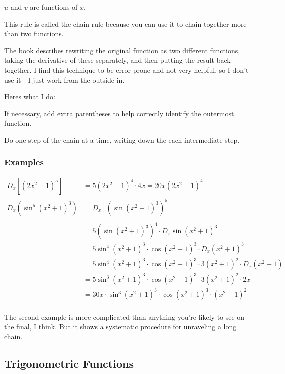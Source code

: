 \documentclass[fleqn]{article}
\begin{document}
$u$ and $v$ are functions of $x$.

This rule is called the chain rule because you can use it to chain together more than two functions.

The book describes rewriting the original function as two different functions, taking the derivative of these
separately, and then putting the result back together.  I find this technique to be error-prone and not very helpful, so
I don't use it---I just work from the outside in.  

Heres what I do:
\begin{itemize*}
\item If necessary, add extra parentheses to help correctly identify the outermost function.
\item Do one step of the chain at a time, writing down the each intermediate step.
\end{itemize*}


\subsubsection{Examples}
\begin{align*}
  D_x \left[ (2x^2 - 1)^5 \right] &= 5 (2x^2 - 1)^4 \cdot 4x = 20x (2x^2 - 1)^4 \\
  D_x \left( \sin^5 (x^2 + 1)^3 \right) &= D_x \left[ \left( \sin (x^2 + 1)^3 \right)^5 \right] \\
      &= 5 ( \sin (x^2 + 1)^3 )^4 \cdot D_x \sin (x^2 + 1)^3 \\
      &= 5 \sin^4 (x^2 + 1)^3 \cdot \cos (x^2 + 1)^3 \cdot D_x (x^2 + 1)^3 \\
      &= 5 \sin^4 (x^2 + 1)^3 \cdot \cos (x^2 + 1)^3 \cdot 3 (x^2 + 1)^2 \cdot D_x (x^2 + 1) \\
     &= 5 \sin^3 (x^2 + 1)^3 \cdot \cos (x^2 + 1)^3 \cdot 3 (x^2 + 1)^2 \cdot 2x \\
      &= 30x \cdot \sin^3 (x^2 + 1)^3 \cdot \cos (x^2 + 1)^3 \cdot (x^2 + 1)^2 \\
\end{align*}

The second example is more complicated than anything you're likely to see on the final, I think.  But it shows a
systematic procedure for unraveling a long chain.

\subsection{Trigonometric Functions}
\end{document}
